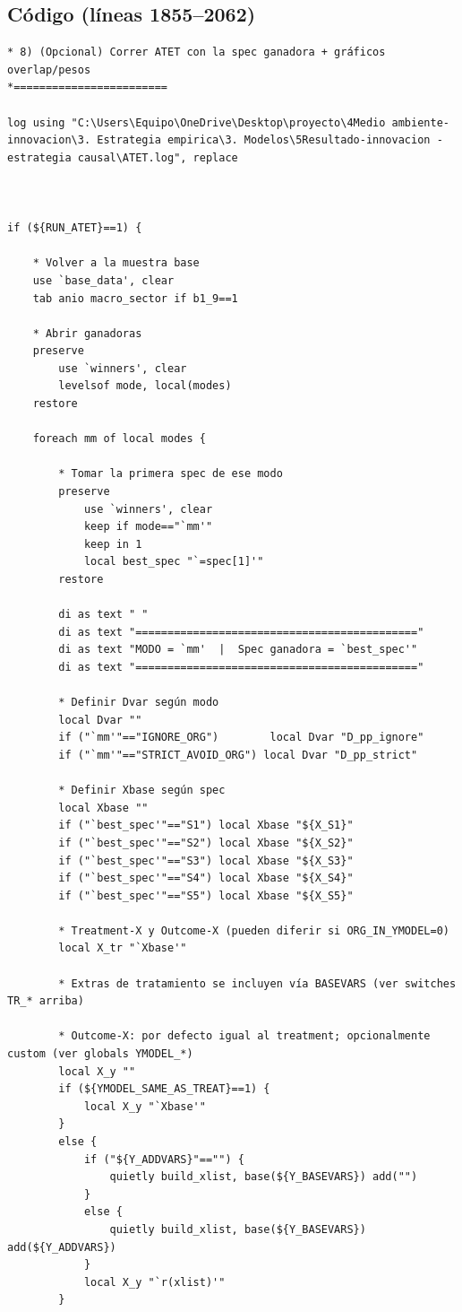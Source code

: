 \documentclass[12pt]{article}
\begin{document}
\subsection*{Código (líneas 1855--2062)}
\begin{lstlisting}
* 8) (Opcional) Correr ATET con la spec ganadora + gráficos overlap/pesos
*========================

log using "C:\Users\Equipo\OneDrive\Desktop\proyecto\4Medio ambiente- innovacion\3. Estrategia empirica\3. Modelos\5Resultado-innovacion - estrategia causal\ATET.log", replace



if (${RUN_ATET}==1) {

    * Volver a la muestra base
    use `base_data', clear
	tab anio macro_sector if b1_9==1

    * Abrir ganadoras
    preserve
        use `winners', clear
        levelsof mode, local(modes)
    restore

    foreach mm of local modes {

        * Tomar la primera spec de ese modo
        preserve
            use `winners', clear
            keep if mode=="`mm'"
            keep in 1
            local best_spec "`=spec[1]'"
        restore

        di as text " "
        di as text "============================================"
        di as text "MODO = `mm'  |  Spec ganadora = `best_spec'"
        di as text "============================================"

        * Definir Dvar según modo
        local Dvar ""
        if ("`mm'"=="IGNORE_ORG")        local Dvar "D_pp_ignore"
        if ("`mm'"=="STRICT_AVOID_ORG") local Dvar "D_pp_strict"

        * Definir Xbase según spec
        local Xbase ""
        if ("`best_spec'"=="S1") local Xbase "${X_S1}"
        if ("`best_spec'"=="S2") local Xbase "${X_S2}"
        if ("`best_spec'"=="S3") local Xbase "${X_S3}"
        if ("`best_spec'"=="S4") local Xbase "${X_S4}"
        if ("`best_spec'"=="S5") local Xbase "${X_S5}"

        * Treatment-X y Outcome-X (pueden diferir si ORG_IN_YMODEL=0)
        local X_tr "`Xbase'"

        * Extras de tratamiento se incluyen vía BASEVARS (ver switches TR_* arriba)

        * Outcome-X: por defecto igual al treatment; opcionalmente custom (ver globals YMODEL_*)
        local X_y ""
        if (${YMODEL_SAME_AS_TREAT}==1) {
            local X_y "`Xbase'"
        }
        else {
            if ("${Y_ADDVARS}"=="") {
                quietly build_xlist, base(${Y_BASEVARS}) add("")
            }
            else {
                quietly build_xlist, base(${Y_BASEVARS}) add(${Y_ADDVARS})
            }
            local X_y "`r(xlist)'"
        }


\end{lstlisting}
\end{document}
